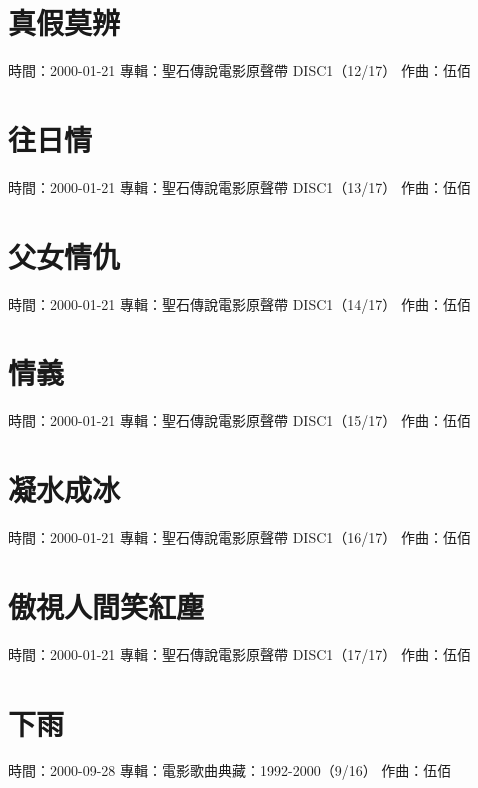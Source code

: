 \documentclass[UTF8,a4paper,oneside,twocolumn,12pt]{ctexbook}
\newcommand{\infopair}[2]{\textbullet #1：#2}
\newcommand{\zq}[1][伍佰]{\infopair{作曲}{#1}}
\newcommand{\zj}[1]{\infopair{專輯}{#1}}
\newcommand{\sj}[1]{\infopair{時間}{#1}}
\newenvironment{info}{\begin{flushleft}\kaishu
	}
	{\end{flushleft}\normalsize\yahei\par}
\begin{document}
\section{真假莫辨}
\begin{info}
	\sj{2000-01-21}
	\zj{聖石傳說電影原聲帶 DISC1（12/17）}
	\zq
\end{info}

\section{往日情}
\begin{info}
	\sj{2000-01-21}
	\zj{聖石傳說電影原聲帶 DISC1（13/17）}
	\zq
\end{info}

\section{父女情仇}
\begin{info}
	\sj{2000-01-21}
	\zj{聖石傳說電影原聲帶 DISC1（14/17）}
	\zq
\end{info}

\section{情義}
\begin{info}
	\sj{2000-01-21}
	\zj{聖石傳說電影原聲帶 DISC1（15/17）}
	\zq
\end{info}

\section{凝水成冰}
\begin{info}
	\sj{2000-01-21}
	\zj{聖石傳說電影原聲帶 DISC1（16/17）}
	\zq
\end{info}

\section{傲視人間笑紅塵}
\begin{info}
	\sj{2000-01-21}
	\zj{聖石傳說電影原聲帶 DISC1（17/17）}
	\zq
\end{info}

\section{下雨}
\begin{info}
	\sj{2000-09-28}
	\zj{電影歌曲典藏：1992-2000（9/16）}
	\zq
\end{info}
\end{document}
